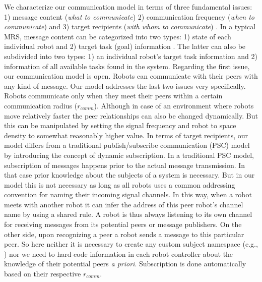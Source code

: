 We characterize our communication model in terms of three fundamental issues: 1) message content ({\em what to communicate}) 2) communication frequency ({\em when to communicate}) and 3) target recipients ({\em with whom to communicate}) \cite{Gerkey}. In a typical MRS, message content can be categorized into two types: 1) state of each individual robot and 2) target task (goal) information \cite{Balch}. The latter can also be subdivided into two types: 1) an individual robot's target task information and 2) information of all available tasks found in the system. Regarding the first issue, our communication model is open. Robots can communicate with their peers with any kind of message. Our model addresses the last two issues very specifically. Robots communicate only when they meet their peers within a certain communication radius ($r_{comm}$). Although in case of an environment where robots move relatively faster the peer relationships can also be changed dynamically. But this can be manipulated by setting the signal frequency and robot to space density to somewhat reasonably higher value. In terms of target recipients, our model differs from a traditional publish/subscribe communication (PSC) model by introducing the concept of dynamic subscription. In a traditional PSC model, subscription of messages happens prior to the actual message transmission. In that case prior knowledge about the subjects of a system is necessary. But in our model this is not necessary as long as all robots uses a common addressing convention for naming their incoming signal channels. In this way, when a robot meets with another robot it can infer the address of this peer robot's channel name by using a shared rule. A robot is thus always listening to its own channel for receiving messages from its potential peers or message publishers. On the other side, upon recognizing a peer a robot sends a message to this particular peer. So here neither it is necessary to create any custom subject namespace (e.g., \cite{Gerkey}) nor we need to hard-code information in each robot controller about the knowledge of their potential peers {\em a priori}. Subscription is done automatically based on their respective $r_{comm}$.
